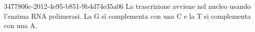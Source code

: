 \documentclass[preview]{standalone}
\begin{document}
\genpage

\begin{snippet}{3477806c-2012-4e95-b851-9b4d74e35a06}
    La trascrizione avviene nel nucleo usando l'enzima RNA polimerasi.
    La G si complementa con una C e la T si complementa con una A.
\end{snippet}
\end{document}
